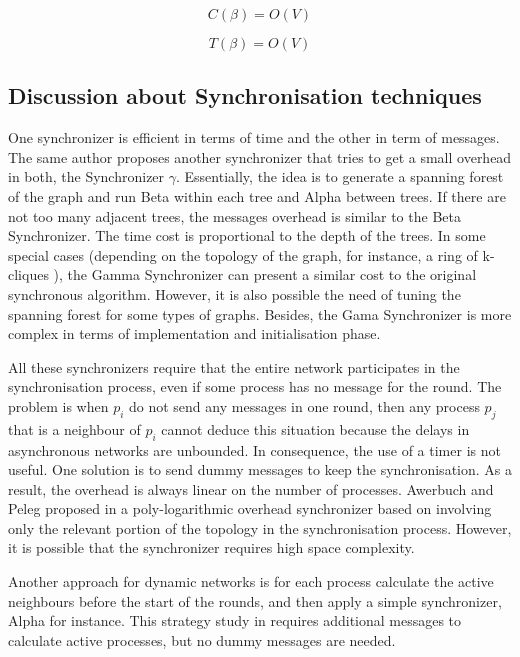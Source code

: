 \begin{equation}
\label{ec:message-beta}
 C(\beta) = O(V)
 \end{equation}

\begin{equation}
\label{ec:time-beta}
 T(\beta) = O(V) 
\end{equation}

\subsection{Discussion about Synchronisation techniques}

One synchronizer is efficient in terms of time and the other in term of messages. The same author proposes \cite{awerbuch1985complexity} another synchronizer that tries to get a small overhead in both, the Synchronizer $\gamma$. Essentially, the idea is to generate a spanning forest of the graph and run Beta within each tree and Alpha between trees. If there are not too many adjacent trees, the messages overhead is similar to the Beta Synchronizer. The time cost is proportional to the depth of the trees. In some special cases  (depending on the topology of the graph, for instance, a ring of k-cliques \cite{lynch1996distributed}), the Gamma Synchronizer can present a similar cost to the original synchronous algorithm. However, it is also possible the need of tuning the spanning forest for some types of graphs. Besides, the Gama Synchronizer is more complex in terms of implementation and initialisation phase.

All these synchronizers require that the entire network participates in the synchronisation process, even if some process has no message for the round. The problem is when $p_i$ do not send any messages in one round, then any process $p_j$ that is a neighbour of $p_i$ cannot deduce this situation because the delays in asynchronous networks are unbounded. In consequence, the use of a timer is not useful. One solution is to send dummy messages to keep the synchronisation. As a result, the overhead is always linear on the number of processes. Awerbuch and Peleg proposed in \cite{awerbuch1990network} a poly-logarithmic overhead synchronizer based on involving only the relevant portion of the topology in the synchronisation process. However, it is possible that the synchronizer requires high space complexity.

Another approach for dynamic networks is for each process calculate the active neighbours before the start of the rounds, and then apply a simple synchronizer, Alpha for instance. This strategy study in \cite{AspnesW2007} requires additional messages to calculate active processes, but no dummy messages are needed. 

